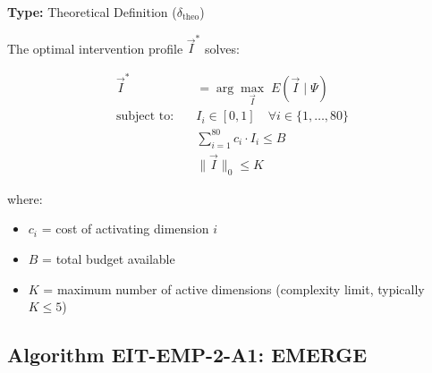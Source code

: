 \begin{tcolorbox}[colback=blue!5!white, colframe=blue!75!black,
    title=\textbf{Definition EIT-EMP-2-D2: Optimal Intervention Profile}]

\textbf{Type:} Theoretical Definition ($\delta_{\text{theo}}$)

The optimal intervention profile $\vec{I}^*$ solves:

\begin{align}
\vec{I}^* &= \arg\max_{\vec{I}} \; E(\vec{I} \;|\; \Psi) \label{eq:objective-main}\\
\text{subject to:} \quad & I_i \in [0,1] \quad \forall i \in \{1, \ldots, 80\} \tag{Bounds}\\
& \sum_{i=1}^{80} c_i \cdot I_i \leq B \tag{Budget} \\
& \|\vec{I}\|_0 \leq K \tag{Complexity}
\end{align}

where:
\begin{itemize}[nosep]
    \item $c_i$ = cost of activating dimension $i$
    \item $B$ = total budget available
    \item $K$ = maximum number of active dimensions (complexity limit, typically $K \leq 5$)
\end{itemize}

\end{tcolorbox}

\subsection{Algorithm EIT-EMP-2-A1: EMERGE}
\label{subsec:emerge-algorithm}


